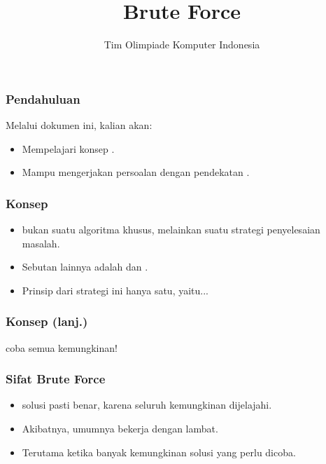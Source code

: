 

\title{Brute Force}
\author{Tim Olimpiade Komputer Indonesia}
\date{}



\begin{frame}
\titlepage
\end{frame}

\begin{frame}
\frametitle{Pendahuluan}
Melalui dokumen ini, kalian akan:
\begin{itemize}
  \item Mempelajari konsep \fbruteForce.
  \item Mampu mengerjakan persoalan dengan pendekatan \fbruteForce.
\end{itemize}
\end{frame}

\begin{frame}
\frametitle{Konsep}
\begin{itemize}
  \item \newTerm{\fBruteForce} bukan suatu algoritma khusus, melainkan suatu strategi penyelesaian masalah.
  \item Sebutan lainnya adalah \fCompleteSearch dan \fExhaustiveSearch.
  \item Prinsip dari strategi ini hanya satu, yaitu...
\end{itemize}
\end{frame}

\begin{frame}
\frametitle{Konsep (lanj.)}
\begin{center}
  \huge coba semua kemungkinan!
\end{center}
\end{frame}

\begin{frame}
\frametitle{Sifat Brute Force}
\begin{itemize}
  \item \fBruteForce {} solusi pasti benar, karena seluruh kemungkinan dijelajahi.
  \item Akibatnya, umumnya \fbruteForce bekerja dengan lambat.
  \item Terutama ketika banyak kemungkinan solusi yang perlu dicoba.
\end{itemize}
\end{frame}

